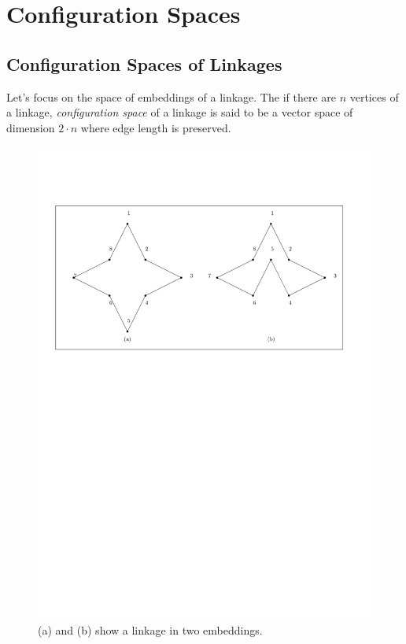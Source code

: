 \section{Configuration Spaces}
\subsection{Configuration Spaces of Linkages}
Let's focus on the space of embeddings of a linkage. The if there are $n$ vertices of a linkage, 
\textit{configuration space} of a linkage is said to be a vector space of dimension $2\cdot n$ 
where edge length is preserved.  
\begin{figure}[!h]
\begin{center}
\includegraphics[scale=.75]{graphics/twoEmbeddingsOfSameLinkage.pdf}
\end{center} 
\caption{(a) and (b) show a linkage in two embeddings.}
\label{fig:configuration-3}
\end{figure}
